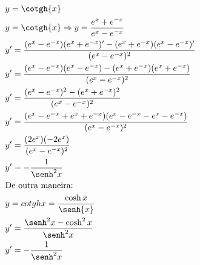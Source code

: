 \begin{ex}
\begin{align}
&y=\cotgh{x}\nonumber\\
&y=\cotgh{x} \Rightarrow y= \frac{e^{x}+e^{-x}}{e^{x}-e^{-x}}\nonumber\\
&y'=\frac{(e^{x}-e^{-x})(e^{x}+e^{-x})'-(e^{x}+e^{-x})(e^{x}-e^{-x})'}{(e^{x}-e^{-x})^2}\nonumber\\
&y'=\frac{(e^{x}-e^{-x})(e^{x}-e^{-x})-(e^{x}+e^{-x})(e^{x}+e^{-x})}{(e^{x}-e^{-x})^2}\nonumber\\
&y'=\frac{(e^{x}-e^{-x})^2-(e^{x}+e^{-x})^2}{(e^{x}-e^{-x})^2}\nonumber\\
&y'=\frac{(e^{x}-e^{-x}+e^{x}+e^{-x})(e^{x}-e^{-x}-e^{x}-e^{-x})}{(e^{x}-e^{-x})^2}\nonumber\\
&y'=\frac{(2e^{x})(-2e^{x})}{(e^{x}-e^{-x})^2}\nonumber\\
&y'=-\frac{1}{\senh^2{x}}\nonumber\\
&\text{De outra maneira:}\nonumber\\
&y=cotgh{x}=\frac{\cosh{x}}{\senh{x}}\nonumber\\
&y'=\frac{\senh^2{x}-\cosh^2{x}}{\senh^2{x}}\nonumber\\
&y'=-\frac{1}{\senh^2{x}}\nonumber
\end{align}
\end{ex}
